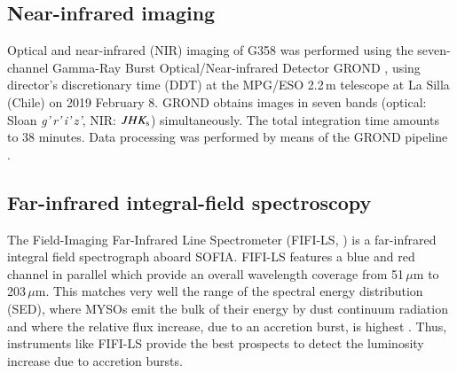 
\subsection{Near-infrared imaging}\label{nir}
Optical and near-infrared (NIR) imaging of G358 was performed using the seven-channel Gamma-Ray Burst Optical/Near-infrared Detector GROND \citep{2008PASP..120..405G}, using director's discretionary time (DDT) at the MPG/ESO 2.2\,m telescope at La Silla (Chile) on 2019 February 8. GROND obtains images in seven bands (optical: Sloan {\it g'\,r'\,i'\,z'}, NIR: $J H K_{\rm s}$) simultaneously. The total integration time amounts to 38 minutes. Data processing was performed by means of the GROND pipeline \citep{2008ApJ...685..376K}.

\subsection{Far-infrared integral-field spectroscopy}\label{fifi}
The Field-Imaging Far-Infrared Line Spectrometer (FIFI-LS, \citealp{2000SPIE.4014...14L, 2018JAI.....740003F, 2018JAI.....740004C}) is a far-infrared integral field spectrograph aboard SOFIA. FIFI-LS features a blue and red channel in parallel which provide an overall wavelength coverage from 51\,$\mu$m to 203\,$\mu$m. This matches very well the range of the spectral energy distribution (SED), where MYSOs emit the bulk of their energy by dust continuum radiation and where the relative flux increase, due to an accretion burst, is highest \citep{2019MNRAS.487.4465M}. Thus, instruments like FIFI-LS provide the best prospects to detect the luminosity increase due to accretion bursts. 

